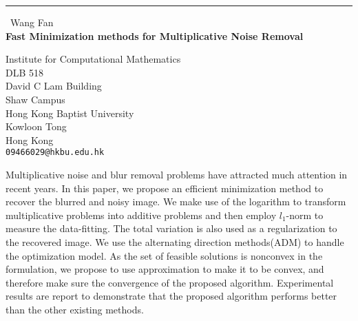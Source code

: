 \documentclass{report}
\begin{document}
\begin{center}
\rule{6in}{1pt} \
{\large Wang Fan \\
{\bf Fast Minimization methods for Multiplicative Noise Removal}}

Institute for Computational Mathematics \\ DLB 518 \\ David C Lam Building \\ Shaw Campus \\ Hong Kong Baptist University \\ Kowloon Tong \\ Hong Kong
\\
{\tt 09466029@hkbu.edu.hk}\end{center}

Multiplicative noise and blur removal problems have attracted much
attention in recent years. In this paper, we propose an efficient
minimization method to recover the blurred and noisy image. We make use
of the logarithm to transform multiplicative problems into additive
problems and then employ $l_1$-norm to measure the data-fitting. The
total variation is also used as a regularization to the recovered image.
We use the alternating direction methods(ADM) to handle the optimization
model. As the set of feasible solutions is nonconvex in the formulation,
we propose to use approximation to make it to be convex, and therefore
make sure the convergence of the proposed algorithm. Experimental results
are report to demonstrate that the proposed algorithm performs better
than the other existing methods.
\end{document}
